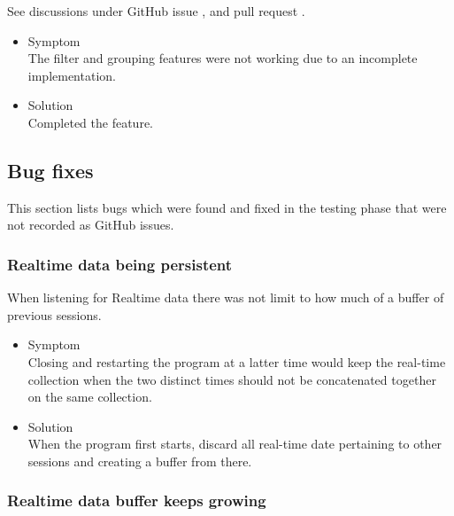 \documentclass[oneside, english, final]{design}
\begin{document}
See discussions under GitHub issue \href{https://github.com/DHSTTOS/implementation/issues/86}{\color{blue}{\#86}}, \href{https://github.com/DHSTTOS/implementation/issues/86}{\color{blue}{\#74}} and pull request \href{https://github.com/DHSTTOS/implementation/issues/101}{\color{blue}{\#101}}.

\begin{itemize}
      \item{Symptom
            \\
            The filter and grouping features were not working due to an incomplete implementation.}

      \item{Solution
            \\
            Completed the feature.
            }
\end{itemize}


\newpage

\subsection{Bug fixes}

This section lists bugs which were found and fixed in the testing phase that were not recorded as GitHub issues.
\\



\subsubsection{Realtime data being persistent}

When listening for Realtime data there was not limit to how much of a buffer of previous sessions.

\begin{itemize}
      \item{Symptom
            \\
            Closing and restarting the program at a latter time would keep the real-time collection when the two distinct times should not be concatenated together on the same collection.
	}
      \item{Solution
            \\
            When the program first starts, discard all real-time date pertaining to other sessions and creating a buffer from there.
            }
\end{itemize}


\subsubsection{Realtime data buffer keeps growing}
\end{document}
